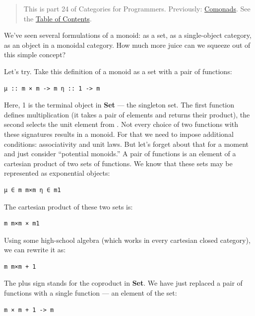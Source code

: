 \begin{quote}
This is part 24 of Categories for Programmers. Previously:
\href{https://bartoszmilewski.com/2017/01/02/comonads/}{Comonads}. See
the
\href{https://bartoszmilewski.com/2014/10/28/category-theory-for-programmers-the-preface/}{Table
of Contents}.
\end{quote}

We've seen several formulations of a monoid: as a set, as a
single-object category, as an object in a monoidal category. How much
more juice can we squeeze out of this simple concept?

Let's try. Take this definition of a monoid as a set  with a
pair of functions:

\begin{verbatim}
μ :: m × m -> m η :: 1 -> m
\end{verbatim}

Here, 1 is the terminal object in \textbf{Set} --- the singleton set.
The first function defines multiplication (it takes a pair of elements
and returns their product), the second selects the unit element from
. Not every choice of two functions with these signatures
results in a monoid. For that we need to impose additional conditions:
associativity and unit laws. But let's forget about that for a moment
and just consider ``potential monoids.'' A pair of functions is an
element of a cartesian product of two sets of functions. We know that
these sets may be represented as exponential objects:

\begin{verbatim}
μ ∈ m m×m η ∈ m1
\end{verbatim}

The cartesian product of these two sets is:

\begin{verbatim}
m m×m × m1
\end{verbatim}

Using some high-school algebra (which works in every cartesian closed
category), we can rewrite it as:

\begin{verbatim}
m m×m + 1
\end{verbatim}

The plus sign stands for the coproduct in \textbf{Set}. We have just
replaced a pair of functions with a single function --- an element of
the set:

\begin{verbatim}
m × m + 1 -> m
\end{verbatim}

